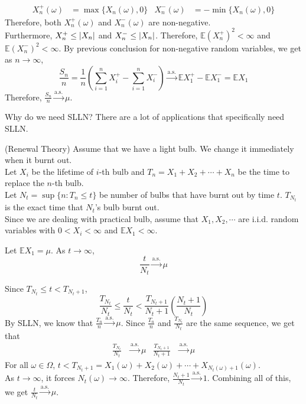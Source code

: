 \documentclass{huhtakm-template-book}
\newcommand{\expect}{\mathbb{E}}
\begin{document}
\begin{proofing}
\begin{align*}
        X_{n}^{+}(\omega)&=\max\{X_{n}(\omega),0\} & X_{n}^{-}(\omega)&=-\min\{X_{n}(\omega),0\}
    \end{align*}
    Therefore, both $X_{n}^{+}(\omega)$ and $X_{n}^{-}(\omega)$ are non-negative.\\
    Furthermore, $X_{n}^{+}\leq\left|{X_{n}}\right|$ and $X_{n}^{-}\leq\left|{X_{n}}\right|$. Therefore, $\expect(X_{n}^{+})^{2}<\infty$ and $\expect(X_{n}^{-})^{2}<\infty$.
    By previous conclusion for non-negative random variables, we get as $n\to\infty$,
    \begin{equation*}
        \frac{S_{n}}{n}=\frac{1}{n}\left(\sum_{i=1}^{n}X_{i}^{+}-\sum_{i=1}^{n}X_{i}^{-}\right)\xrightarrow{\text{a.s.}}\expect X_{1}^{+}-\expect X_{1}^{-}=\expect X_{1}
    \end{equation*}
    Therefore, $\frac{S_{n}}{n}\xrightarrow{\text{a.s.}}\mu$.
\end{proofing}
\newpage
Why do we need SLLN? There are a lot of applications that specifically need SLLN.
\begin{eg}(Renewal Theory) Assume that we have a light bulb. We change it immediately when it burnt out.\\
Let $X_{i}$ be the lifetime of $i$-th bulb and $T_{n}=X_{1}+X_{2}+\cdots+X_{n}$ be the time to replace the $n$-th bulb.\\
Let $N_{t}=\sup\{n:T_{n}\leq t\}$ be number of bulbs that have burnt out by time $t$. $T_{N_{t}}$ is the exact time that $N_{t}$'s bulb burnt out.\\
Since we are dealing with practical bulb, assume that $X_{1},X_{2},\cdots$ are i.i.d. random variables with $0<X_{i}<\infty$ and $\expect X_{1}<\infty$.
\end{eg}
\begin{thm}
    Let $\expect X_{1}=\mu$. As $t\to\infty$,
    \begin{equation*}
        \frac{t}{N_{t}}\xrightarrow{\text{a.s.}}\mu
    \end{equation*}
\end{thm}
\begin{proofing}
    Since $T_{N_{t}}\leq t<T_{N_{t}+1}$,
    \begin{equation*}
        \frac{T_{N_{t}}}{N_{t}}\leq\frac{t}{N_{t}}<\frac{T_{N_{t}+1}}{N_{t}+1}\left(\frac{N_{t}+1}{N_{t}}\right)
    \end{equation*}
    By SLLN, we know that $\frac{T_{n}}{n}\xrightarrow{\text{a.s.}}\mu$. Since $\frac{T_{n}}{n}$ and $\frac{T_{N_{t}}}{N_{t}}$ are the same sequence, we get that
    \begin{align*}
        \frac{T_{N_{t}}}{N_{t}}&\xrightarrow{\text{a.s.}}\mu & \frac{T_{N_{t}+1}}{N_{t}+1}&\xrightarrow{\text{a.s.}}\mu
    \end{align*}
    For all $\omega\in\Omega$, $t<T_{N_{t}+1}=X_{1}(\omega)+X_{2}(\omega)+\cdots+X_{N_{t}(\omega)+1}(\omega)$.\\
    As $t\to\infty$, it forces $N_{t}(\omega)\to\infty$. Therefore, $\frac{N_{t}+1}{N_{t}}\xrightarrow{\text{a.s.}}1$.
    Combining all of this, we get $\frac{t}{N_{t}}\xrightarrow{\text{a.s.}}\mu$.
\end{proofing}
\end{document}
